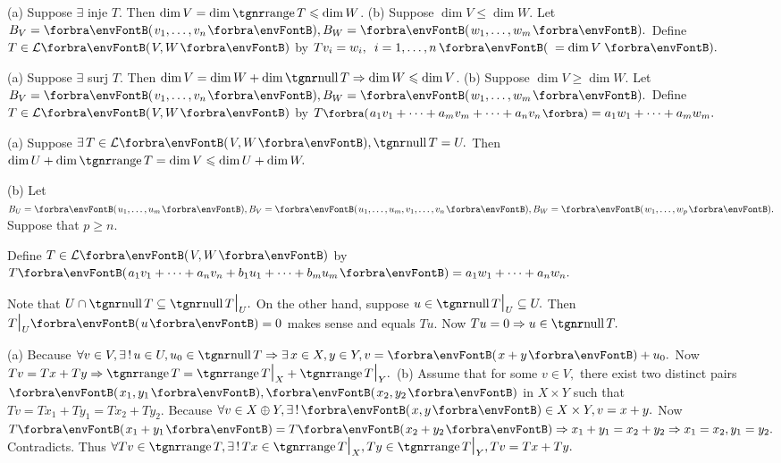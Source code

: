 (a) Suppose $\exists$ inje $T$. Then $\dim V=\dim\range T\leqslant\dim W$.\parSol{}
(b) Suppose $\dim V\leqslant\dim W.$ Let $B_V=\Par{v_1,\dots,v_n},B_W=\Par{w_1,\dots,w_m}.$\parSol{\Hb}
Define $T\in\Lm{V,W}$ by $Tv_i=w_i,\,\,\,i=1,\dots,n\,\Par{\,=\dim V\,}.$\PfEnd
\SepLine

(a) Suppose $\exists$ surj $T$. Then $\dim V=\dim W+\dim\null T\Rightarrow\dim W\leqslant\dim V$.\parSol{}
(b) Suppose $\dim V\geqslant\dim W.$ Let $B_V=\Par{v_1,\dots,v_n},B_W=\Par{w_1,\dots,w_m}.$\parSol{\Hb}
Define $T\in\Lm{V,W}$ by $T\BigPar{a_1 v_1+\dots+a_m v_m+\dots+a_n v_n}=a_1 w_1+\dots+a_m w_m.$\PfEnd
\SepLine

\par\quad
(a) Suppose $\exists\,T\in\Lm{V,W},\null T=U.$ Then $\dim U+\dim\range T=\dim V\leqslant\dim U+\dim W.$\par\quad
(b) Let $B_U=\Par{u_1,\dots,u_m},B_V=\Par{u_1,\dots,u_m,v_1,\dots,v_n},B_W=\Par{w_1,\dots,w_p}.$ Suppose that $p\geqslant n.$\par\quad\Hb
Define $T\in\Lm{V,W}$ by $T\Par{a_1 v_1+\dots+a_n v_n+b_1 u_1+\dots+b_m u_m}=a_1 w_1+\dots+a_n w_n.$\PfEnd
\SepLine\pagebreak

Note that $U\cap\null T\subseteq\null T\mmid_U.$ On the other hand, suppose $u\in\null T\mmid_U\subseteq U.$\parSol{}
Then $T\mmid_U\Par{u}=0$ makes sense and equals $Tu.$ Now $Tu=0\Rightarrow u\in\null T.$\PfEnd
\SepLine

(a) Because $\forall v\in V,\exists\,!\,u\in U,u_0\in\null T\Rightarrow\exists\,x\in X,y\in Y,v=\Par{x+y}+u_0.$\parSol{\Ha}
Now $Tv=Tx+Ty\Rightarrow\range T=\range T\mmid_X+\range T\mmid_Y.$\parSol{\vspace{2pt}}
(b) Assume that for some $v\in V,$ there exist two distinct pairs $\Par{x_1,y_1},\Par{x_2,y_2}$ in $X\times Y$\parSol{\Hb}
such that $Tv=Tx_1+Ty_1=Tx_2+Ty_2.$ Because $\forall v\in X\oplus Y,\exists\,!\,\Par{x,y}\in X\times Y,v=x+y.$\parSol{\Hb}
Now $T\Par{x_1+y_1}=T\Par{x_2+y_2}\Rightarrow x_1+y_1=x_2+y_2\Rightarrow x_1=x_2,y_1=y_2.$ Contradicts.\parSol{\Hb}
Thus $\forall Tv\in\range T,\exists\,!\,Tx\in\range T\mmid_X,Ty\in\range T\mmid_Y,Tv=Tx+Ty.$\PfEnd
\SepLine

